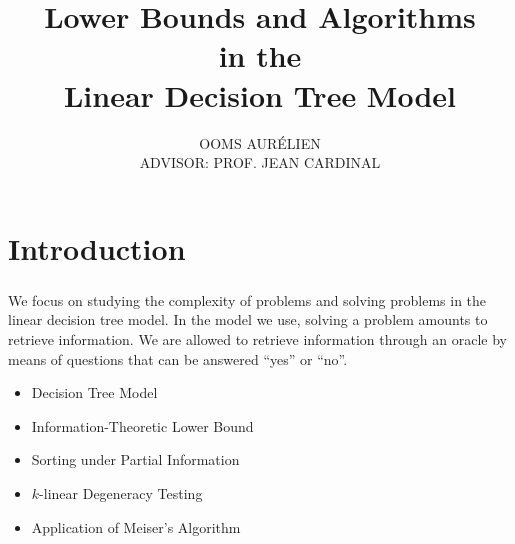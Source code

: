 \documentclass[10pt,xcolor=x11names,dvipsnames,hyperref={colorlinks=false,breaklinks=true,bookmarks=true}]{beamer}
\begin{document}
\title[]{\textbf{Lower Bounds and Algorithms\\ in the\\ Linear Decision Tree Model\vspace{3mm}}}
\author[]{\large OOMS AURÉLIEN\\ADVISOR: PROF. JEAN CARDINAL\vspace{5mm}}
\date{}

\begin{frame}
\titlepage{}
\end{frame}

\section{Introduction}
\begin{frame}\frametitle{\insertsection}\justifying
We focus on studying the complexity of problems and solving problems
in the linear decision tree model. In the model we use, solving a problem
amounts to retrieve information. We are allowed to retrieve information
through an oracle by means of questions that
can be answered ``yes'' or ``no''.\\[7mm]\pause
{}
\begin{itemize}[label={\color{prussianblue}$\bullet$},itemsep=6pt]
\item Decision Tree Model\pause
\item Information-Theoretic Lower Bound\pause
\item Sorting under Partial Information\pause
\item \(k\)-linear Degeneracy Testing\pause
\item Application of Meiser's Algorithm
\end{itemize}
\end{frame}
\end{document}
